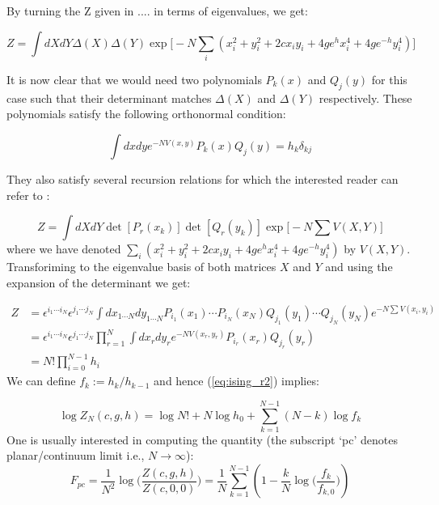 \documentclass[11pt]{article}
\begin{document}
\vspace{10mm}
By turning the Z given in .... in terms of eigenvalues, we get:

\begin{equation}
	Z = \int dX dY \Delta(X) \Delta(Y)
	 \exp \Big[-N \sum_{i} (x_{i}^2 + y_{i}^{2} +2c x_{i}y_{i} + 4ge^{h}x_{i}^{4} + 4ge^{-h}y_{i}^4) \Big]
	\end{equation}

It is now clear that we would need two polynomials $P_{k}(x)$ and $Q_{j}(y)$ for this case such that their determinant matches 
$\Delta(X)$ and $\Delta(Y)$ respectively. 
These polynomials satisfy the following orthonormal condition: 

\begin{equation}
\int dx dy e^{-N V(x,y)} P_{k}(x) Q_{j}(y) = h_{k} \delta_{kj}
\end{equation}

They also satisfy several recursion relations for which the interested reader can refer to 
\cite{Boulatov:1986sb}:

\begin{equation}
	Z = \int dX dY \det[P_{r}(x_k)] \det[Q_{r}(y_k)] \exp\Big[-N \sum V(X,Y)\Big]
\end{equation}
where we have denoted $\sum_{i} (x_{i}^2 + y_{i}^{2} +2c x_{i}y_{i} + 4ge^{h}x_{i}^{4} + 4ge^{-h}y_{i}^4)$ by $V(X,Y)$. Transforiming to the eigenvalue basis of both matrices $X$ and $Y$ and using the expansion of the determinant we get:

\begin{align}
	Z &= \epsilon^{i_1 \cdots i_N} \epsilon^{j_1 \cdots j_N} \int dx_{1 \cdots N}
	dy_{1 \cdots N} P_{i_{1}}(x_1) \cdots P_{i_{N}}(x_N)
	Q_{j_{1}}(y_1) \cdots Q_{j_{N}}(y_N)
	e^{-N \sum V(x_i,y_i)} \nonumber  \\  
	&= \epsilon^{i_1 \cdots i_N} \epsilon^{j_1 \cdots j_N} \prod_{r=1}^{N} \int dx_{r} dy_{r} e^{-N V(x_r, y_r)} P_{i_r}(x_r) Q_{j_r}(y_r) \nonumber  \\  
	&=  N! \prod_{i=0}^{N-1} h_{i} 
	\label{eq:ising_r2}
\end{align}
We can define $f_{k} := h_k/h_{k-1}$ and hence 
(\ref{eq:ising_r2}) implies:

\begin{equation}
	\log Z_{N}(c,g,h) = \log N! + N \log h_0 + \sum_{k=1}^{N-1} (N-k) \log f_{k} 
\end{equation}
One is usually interested in computing the quantity (the subscript `pc' denotes planar/continuum limit i.e., $ N \to \infty$):
\begin{equation}
	F_{pc} = \frac{1}{N^2} \log\Bigg( \frac{Z(c,g,h)}{Z(c,0,0)}\Bigg) = \frac{1}{N} \sum_{k=1}^{N-1} \left(1 - \frac{k}{N} \log \Big(\frac{f_k}{f_{k,0}}\Big)\right)
\end{equation}
\end{document}
